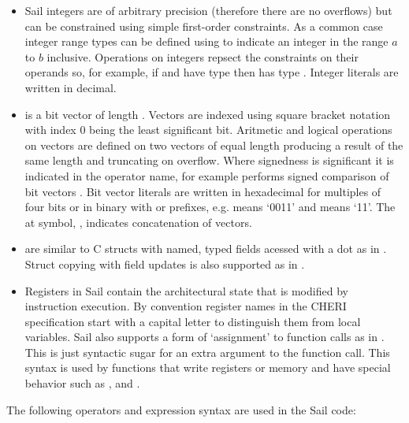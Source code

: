 \label{sailMIPSzbits}
\label{sailRISCVzbits}
\begin{itemize}
\item {} Sail integers are of arbitrary precision (therefore there are no overflows) but can be constrained using simple first-order constraints. As a common case integer range types can be defined using  to indicate an integer in the range $a$ to $b$ inclusive. Operations on integers repsect the constraints on their operands so, for example, if  and  have type  then  has type . Integer literals are written in decimal.
\item {} \label{zbits} is a bit vector of length . Vectors are indexed using square bracket notation with index 0 being the least significant bit. Aritmetic and logical operations on vectors are defined on two vectors of equal length producing a result of the same length and truncating on overflow. Where signedness is significant it is indicated in the operator name, for example  performs signed comparison of bit vectors . Bit vector literals are written in hexadecimal for multiples of four bits or in binary with  or  prefixes, e.g.  means `0011' and  means `11'. The at symbol, , indicates concatenation of vectors.
\item {} are similar to C structs with named, typed fields acessed with a dot as in . Struct copying with field updates is also supported as in .
\item Registers in Sail contain the architectural state that is modified by instruction execution. By convention register names in the CHERI specification start with a capital letter to distinguish them from local variables. Sail also supports a form of `assignment' to function calls as in . This is just syntactic sugar for an extra argument to the function call. This syntax is used by functions that write registers or memory and have special behavior such as ,  and .
\end{itemize}

The following operators and expression syntax are used in the Sail code:

